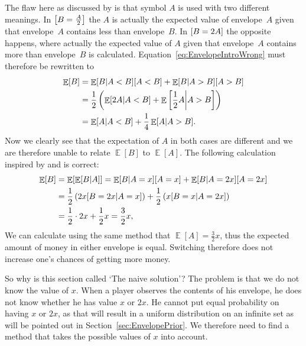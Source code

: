 \documentclass[a4paper]{report}
\theoremstyle{plain}
\theoremstyle{definition}
\theoremstyle{remark}
\numberwithin{equation}{chapter}
\let\P\relax
\DeclareMathOperator{\P}{\mathbb{P}}
\DeclareMathOperator{\E}{\mathbb{E}}
\DeclareMathOperator{\1}{\mathbbm{1}}
\begin{document}
The flaw here as discussed by \cite{WikiEnvelope} is that symbol $A$ is used with two different meanings. In $\P\left[B=\frac{A}{2}\right]$ the $A$ is actually the expected value of envelope~$A$ given that envelope~$A$ contains less than envelope~$B$. In $\P[B=2A]$ the opposite happens, where actually the expected value of $A$ given that envelope~$A$ contains more than envelope~$B$ is calculated. Equation~\ref{eq:EnvelopeIntroWrong} must therefore be rewritten to
\begin{align}
\E[B]&=\E[B|A<B]\P[A<B]+\E[B|A>B]\P[A>B]\\
&=\frac{1}{2}\left(\E[2A|A<B]+\E\left[\frac{1}{2}A\middle|A>B\right]\right)\\
&=\E[A|A<B]+\frac{1}{4}\E[A|A>B].
\end{align}
Now we clearly see that the expectation of $A$ in both cases are different and we are therefore unable to relate $\E[B]$ to $\E[A]$. The following calculation inspired by \cite{Schwitzgebel08} and \cite{Brien14} is correct:
\begin{align}
\E[B]&=\E[\E[B|A]]=\E[B|A=x]\P[A=x]+\E[B|A=2x]\P[A=2x]\\
&=\frac{1}{2}\left(2x\P[B=2x|A=x]\right)+\frac{1}{2}\left(x\P[B=x|A=2x]\right)\\
&=\frac{1}{2}\cdot2x+\frac{1}{2}x=\frac{3}{2}x,
\end{align}
We can calculate using the same method that $\E[A]=\frac{3}{2}x$, thus the expected amount of money in either envelope is equal. Switching therefore does not increase one's chances of getting more money.

So why is this section called `The naive solution'? The problem is that we do not know the value of $x$. When a player observes the contents of his envelope, he does not know whether he has value $x$ or $2x$. He cannot put equal probability on having $x$ or $2x$, as that will result in a uniform distribution on an infinite set as will be pointed out in Section~\ref{sec:EnvelopePrior}. We therefore need to find a method that takes the possible values of $x$ into account.
\end{document}
